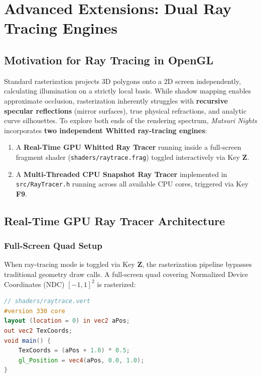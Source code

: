 \chapter{Advanced Extensions: Dual Ray Tracing Engines}
\label{chap:ray_tracing}

\section{Motivation for Ray Tracing in OpenGL}
Standard rasterization projects 3D polygons onto a 2D screen independently, calculating illumination on a strictly local basis. While shadow mapping enables approximate occlusion, rasterization inherently struggles with \textbf{recursive specular reflections} (mirror surfaces), true physical refractions, and analytic curve silhouettes. To explore both ends of the rendering spectrum, \textit{Matsuri Nights} incorporates \textbf{two independent Whitted ray-tracing engines}:
\begin{enumerate}
    \item A \textbf{Real-Time GPU Whitted Ray Tracer} running inside a full-screen fragment shader (\texttt{shaders/raytrace.frag}) toggled interactively via Key \textbf{Z}.
    \item A \textbf{Multi-Threaded CPU Snapshot Ray Tracer} implemented in \texttt{src/RayTracer.h} running across all available CPU cores, triggered via Key \textbf{F9}.
\end{enumerate}

\section{Real-Time GPU Ray Tracer Architecture}
\subsection{Full-Screen Quad Setup}
When ray-tracing mode is toggled via Key \textbf{Z}, the rasterization pipeline bypasses traditional geometry draw calls. A full-screen quad covering Normalized Device Coordinates (NDC) $[-1, 1]^2$ is rasterized:
\begin{lstlisting}[language=GLSL, basicstyle=\ttfamily\scriptsize]
// shaders/raytrace.vert
#version 330 core
layout (location = 0) in vec2 aPos;
out vec2 TexCoords;
void main() {
    TexCoords = (aPos + 1.0) * 0.5;
    gl_Position = vec4(aPos, 0.0, 1.0);
}
\end{lstlisting}

